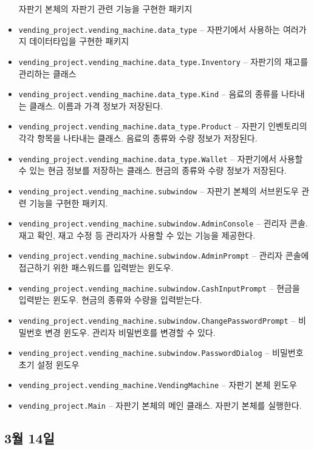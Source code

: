 \documentclass{oblivoir}
\begin{document}
\begin{itemize}
        자판기 본체의 자판기 관련 기능을 구현한 패키지
        \item \texttt{vending\_project.vending\_machine.data\_type} --
        자판기에서 사용하는 여러가지 데이터타입을 구현한 패키지
        \item \texttt{vending\_project.vending\_machine.data\_type.Inventory} --
        자판기의 재고를 관리하는 클래스
        \item \texttt{vending\_project.vending\_machine.data\_type.Kind} --
        음료의 종류를 나타내는 클래스. 이름과 가격 정보가 저장된다.
        \item \texttt{vending\_project.vending\_machine.data\_type.Product} --
        자판기 인벤토리의 각각 항목을 나타내는 클래스. 음료의 종류와 수량 정보가 저장된다.
        \item \texttt{vending\_project.vending\_machine.data\_type.Wallet} --
        자판기에서 사용할 수 있는 현금 정보를 저장하는 클래스. 현금의 종류와 수량 정보가 저장된다.
        \item \texttt{vending\_project.vending\_machine.subwindow} --
        자판기 본체의 서브윈도우 관련 기능을 구현한 패키지.
        \item \texttt{vending\_project.vending\_machine.subwindow.AdminConsole} --
        괸리자 콘솔. 재고 확인, 재고 수정 등 관리자가 사용할 수 있는 기능을 제공한다.
        \item \texttt{vending\_project.vending\_machine.subwindow.AdminPrompt} --
        관리자 콘솔에 접근하기 위한 패스워드를 입력받는 윈도우.
        \item \texttt{vending\_project.vending\_machine.subwindow.CashInputPrompt} --
        현금을 입력받는 윈도우. 현금의 종류와 수량을 입력받는다.
        \item \texttt{vending\_project.vending\_machine.subwindow.ChangePasswordPrompt} --
        비밀번호 변경 윈도우. 관리자 비밀번호를 변경할 수 있다.
        \item \texttt{vending\_project.vending\_machine.subwindow.PasswordDialog} --
        비밀번호 초기 설정 윈도우
        \item \texttt{vending\_project.vending\_machine.VendingMachine} --
        자판기 본체 윈도우
        \item \texttt{vending\_project.Main} --
        자판기 본체의 메인 클래스. 자판기 본체를 실행한다.
    \end{itemize}

    \subsection{3월 14일}
\end{document}

